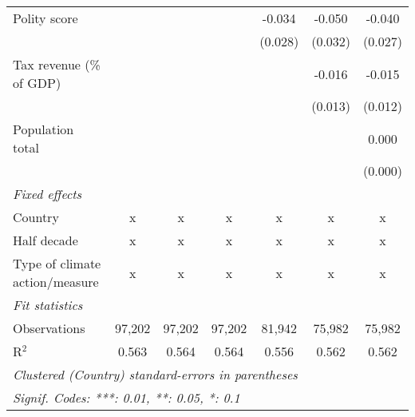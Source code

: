 \begin{tabular}{lcccccc}
   Polity score                                                  &         &               &               & -0.034         & -0.050         & -0.040\\   
                                                                 &         &               &               & (0.028)        & (0.032)        & (0.027)\\   
   Tax revenue (\% of GDP)                                       &         &               &               &                & -0.016         & -0.015\\   
                                                                 &         &               &               &                & (0.013)        & (0.012)\\   
   Population total                                              &         &               &               &                &                & 0.000\\   
                                                                 &         &               &               &                &                & (0.000)\\   
   \emph{Fixed effects}\\
   Country                                                       & x       & x             & x             & x              & x              & x\\  
   Half decade                                                   & x       & x             & x             & x              & x              & x\\  
   Type of climate action/measure                                & x       & x             & x             & x              & x              & x\\  
   \midrule \emph{Fit statistics}\\
   Observations                                                  & 97,202  & 97,202        & 97,202        & 81,942         & 75,982         & 75,982\\  
   R$^2$                                                         & 0.563   & 0.564         & 0.564         & 0.556          & 0.562          & 0.562\\  
   \midrule
   \multicolumn{7}{l}{\emph{Clustered (Country) standard-errors in parentheses}}\\
   \multicolumn{7}{l}{\emph{Signif. Codes: ***: 0.01, **: 0.05, *: 0.1}}\\
\end{tabular}
\par\endgroup


